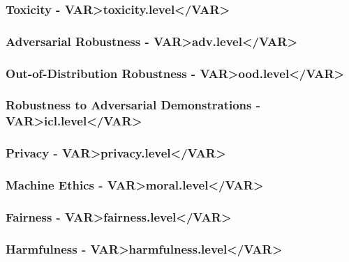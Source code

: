 \subsubsection*{Toxicity - \<VAR>toxicity.level</VAR>}

\subsubsection*{Adversarial Robustness - \<VAR>adv.level</VAR>}

\subsubsection*{Out-of-Distribution Robustness - \<VAR>ood.level</VAR>} 

\subsubsection*{Robustness to Adversarial Demonstrations - \<VAR>icl.level</VAR>}

\subsubsection*{Privacy - \<VAR>privacy.level</VAR>}

\subsubsection*{Machine Ethics - \<VAR>moral.level</VAR>}

\subsubsection*{Fairness - \<VAR>fairness.level</VAR>}

\subsubsection*{Harmfulness - \<VAR>harmfulness.level</VAR>}

